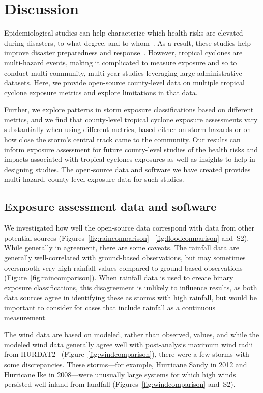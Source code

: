 \section*{Discussion}

Epidemiological studies can help characterize which health risks are elevated
during disasters, to what degree, and to
whom~\parencite{ibrahim2005unfortunate, noji2005disasters}.  As a result, these
studies help improve disaster preparedness and
response~\parencite{noji2005disasters}.  However, tropical cyclones are
multi-hazard events, making it complicated to measure exposure and so to
conduct multi-community, multi-year studies leveraging large administrative
datasets.  Here, we provide open-source county-level data on multiple tropical
cyclone exposure metrics and explore limitations in that data.  

Further, we explore patterns in storm exposure classifications based on
different metrics, and we find that county-level tropical cyclone exposure
assessments vary substantially when using different metrics, based either on
storm hazards or on how close the storm's central track came to the community.
Our results can inform exposure assessment for future county-level studies of
the health risks and impacts associated with tropical cyclones exposures as
well as insights to help in designing studies.  The open-source data and
software we have created provides multi-hazard, county-level exposure data for
such studies.

\subsection*{Exposure assessment data and software}

We investigated how well the open-source data correspond with data from other
potential sources
(Figures~\ref{fig:raincomparison}\,--\,\ref{fig:floodcomparison} and~S2). While
generally in agreement, there are some caveats. The rainfall data are generally
well-correlated with ground-based observations, but may sometimes oversmooth
very high rainfall values compared to ground-based observations
(Figure~\ref{fig:raincomparison}). When rainfall data is used to create binary
exposure classifications, this disagreement is unlikely to influence results,
as both data sources agree in identifying these as storms with high rainfall,
but would be important to consider for cases that include rainfall as a
continuous measurement. 

The wind data are based on modeled, rather than observed, values, and while the
modeled wind data generally agree well with post-analysis maximum wind radii
from \ac{HURDAT2}~\parencite{landsea2013} (Figure~\ref{fig:windcomparison}),
there were a few storms with some discrepancies. These storms---for example, Hurricane Sandy
in 2012 and Hurricane Ike in 2008---were
unusually large systems for which high winds persisted well inland from
landfall (Figures~\ref{fig:windcomparison}
and~S2). 

